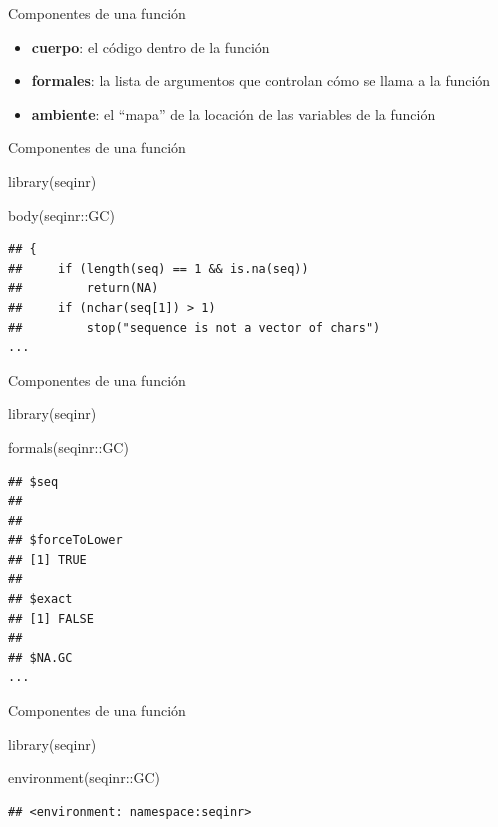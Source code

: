 \documentclass[
  ignorenonframetext,
]{beamer}
\newenvironment{Shaded}{\begin{snugshade}}{\end{snugshade}}
\newcommand{\FunctionTok}[1]{\textcolor[rgb]{0.00,0.00,0.00}{#1}}
\newcommand{\NormalTok}[1]{#1}
\newcommand{\SpecialCharTok}[1]{\textcolor[rgb]{0.00,0.00,0.00}{#1}}
\providecommand{\tightlist}{%
  \setlength{\itemsep}{0pt}\setlength{\parskip}{0pt}}
\begin{document}
\begin{frame}{Componentes de una función}
\protect\hypertarget{componentes-de-una-funciuxf3n}{}
\begin{itemize}
\tightlist
\item
  \textbf{cuerpo}: el código dentro de la función
\item
  \textbf{formales}: la lista de argumentos que controlan cómo se llama
  a la función
\item
  \textbf{ambiente}: el ``mapa'' de la locación de las variables de la
  función
\end{itemize}
\end{frame}

\begin{frame}[fragile]{Componentes de una función}
\protect\hypertarget{componentes-de-una-funciuxf3n-1}{}
\begin{Shaded}
\begin{Highlighting}[]
\FunctionTok{library}\NormalTok{(seqinr)}

\FunctionTok{body}\NormalTok{(seqinr}\SpecialCharTok{::}\NormalTok{GC)}
\end{Highlighting}
\end{Shaded}

\begin{verbatim}
## {
##     if (length(seq) == 1 && is.na(seq)) 
##         return(NA)
##     if (nchar(seq[1]) > 1) 
##         stop("sequence is not a vector of chars")
...
\end{verbatim}
\end{frame}

\begin{frame}[fragile]{Componentes de una función}
\protect\hypertarget{componentes-de-una-funciuxf3n-2}{}
\begin{Shaded}
\begin{Highlighting}[]
\FunctionTok{library}\NormalTok{(seqinr)}

\FunctionTok{formals}\NormalTok{(seqinr}\SpecialCharTok{::}\NormalTok{GC)}
\end{Highlighting}
\end{Shaded}

\begin{verbatim}
## $seq
## 
## 
## $forceToLower
## [1] TRUE
## 
## $exact
## [1] FALSE
## 
## $NA.GC
...
\end{verbatim}
\end{frame}

\begin{frame}[fragile]{Componentes de una función}
\protect\hypertarget{componentes-de-una-funciuxf3n-3}{}
\begin{Shaded}
\begin{Highlighting}[]
\FunctionTok{library}\NormalTok{(seqinr)}

\FunctionTok{environment}\NormalTok{(seqinr}\SpecialCharTok{::}\NormalTok{GC)}
\end{Highlighting}
\end{Shaded}

\begin{verbatim}
## <environment: namespace:seqinr>
\end{verbatim}
\end{frame}
\end{document}
